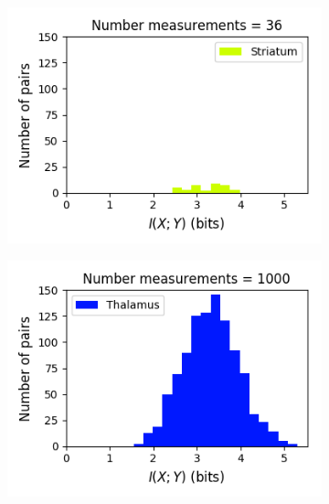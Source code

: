 \documentclass[a4paper,12pt]{article}
\theoremstyle{definition}
\begin{document}
\begin{figure}[p]
\begin{subfigure}{0.5\textwidth}
    \includegraphics[width=\textwidth]{figures/strong_striatum_14_1p0_information_histogram.png}
  \end{subfigure}
  \begin{subfigure}{0.5\textwidth}
    \centering
    \includegraphics[width=\textwidth]{figures/strong_thalamus_8_1p0_information_histogram.png}
  \end{subfigure}
  \begin{subfigure}{0.5\textwidth}
    \centering

\end{subfigure}
\end{figure}
\end{document}
